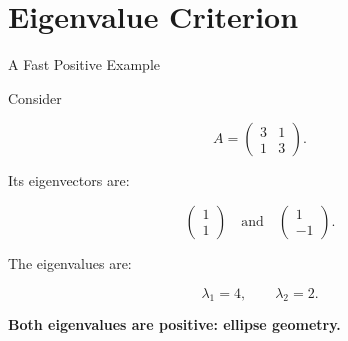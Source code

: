 \documentclass[10pt]{beamer}
\theoremstyle{definition}
\newcommand{\x}[1]{\alert{\textbf{#1}}}
\begin{document}
\section{Eigenvalue Criterion}

\begin{frame}{A Fast Positive Example}

Consider

$$
A=\begin{pmatrix}3&1\\1&3\end{pmatrix}.
$$

\vfill

Its eigenvectors are:

$$
\begin{pmatrix}1\\1\end{pmatrix}
\quad\text{and}\quad
\begin{pmatrix}1\\-1\end{pmatrix}.
$$

\vfill

The eigenvalues are:

$$
\lambda_1=4,\qquad \lambda_2=2.
$$

\vfill

\begin{center}
\x{Both eigenvalues are positive: ellipse geometry.}
\end{center}

\end{frame}
\end{document}
